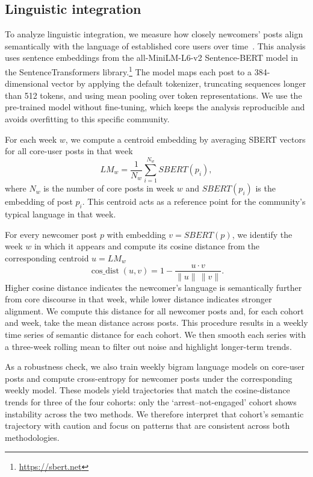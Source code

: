 \documentclass[letterpaper]{article} %
\begin{document}
\subsection{Linguistic integration}
To analyze linguistic integration, we measure how closely newcomers' posts align semantically with the language of established core users over time~\cite{danescu-niculescu-mizil_no_2013}. 
This analysis uses sentence embeddings from the all-MiniLM-L6-v2 Sentence-BERT model in the SentenceTransformers library.\footnote{\url{https://sbert.net}}
The model maps each post to a 384-dimensional vector by applying the default tokenizer, truncating sequences longer than 512 tokens, and using mean pooling over token representations. 
We use the pre-trained model without fine-tuning, which keeps the analysis reproducible and avoids overfitting to this specific community.

For each week $w$, we compute a centroid embedding by averaging SBERT vectors for all core-user posts in that week
\begin{equation}
    LM_w = \frac{1}{N_w} \sum_{i=1}^{N_w} SBERT(p_i),
\end{equation}
where $N_w$ is the number of core posts in week $w$ and $SBERT(p_i)$ is the embedding of post $p_i$. 
This centroid acts as a reference point for the community's typical language in that week.

For every newcomer post $p$ with embedding $v = SBERT(p)$, we identify the week $w$ in which it appears and compute its cosine distance from the corresponding centroid $u = LM_w$
\begin{equation}
    \mathop{cos\_dist}(u, v) = 1 - \frac{u \cdot v}{\|u\|\,\|v\|}.
\end{equation}
Higher cosine distance indicates the newcomer's language is semantically further from core discourse in that week, while lower distance indicates stronger alignment.
We compute this distance for all newcomer posts and, for each cohort and week, take the mean distance across posts. 
This procedure results in a weekly time series of semantic distance for each cohort. 
We then smooth each series with a three-week rolling mean to filter out noise and highlight longer-term trends.

As a robustness check, we also train weekly bigram language models on core-user posts and compute cross-entropy for newcomer posts under the corresponding weekly model. 
These models yield trajectories that match the cosine-distance trends for three of the four cohorts: 
only the `arrest--not-engaged' cohort shows instability across the two methods. 
We therefore interpret that cohort's semantic trajectory with caution and focus on patterns that are consistent across both methodologies.
\end{document}
